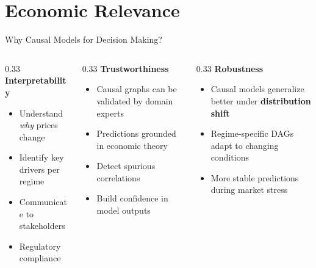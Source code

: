\documentclass[aspectratio=169]{beamer}
\begin{document}
\section{Economic Relevance}

\begin{frame}{Why Causal Models for Decision Making?}
\begin{columns}
\begin{column}{0.33\textwidth}
\textbf{Interpretability}
\begin{itemize}
    \item Understand \textit{why} prices change
    \item Identify key drivers per regime
    \item Communicate to stakeholders
    \item Regulatory compliance
\end{itemize}
\end{column}

\begin{column}{0.33\textwidth}
\textbf{Trustworthiness}
\begin{itemize}
    \item Causal graphs can be validated by domain experts
    \item Predictions grounded in economic theory
    \item Detect spurious correlations
    \item Build confidence in model outputs
\end{itemize}
\end{column}

\begin{column}{0.33\textwidth}
\textbf{Robustness}
\begin{itemize}
    \item Causal models generalize better under \textbf{distribution shift}
    \item Regime-specific DAGs adapt to changing conditions
    \item More stable predictions during market stress
\end{itemize}
\end{column}
\end{columns}
\end{frame}
\end{document}
